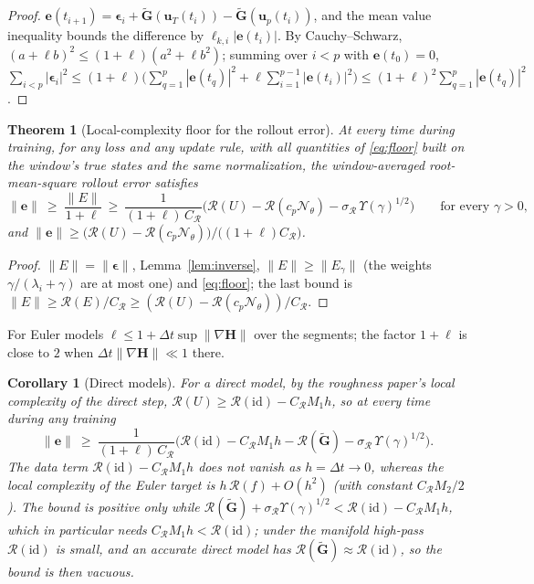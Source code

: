 \documentclass[11pt]{article}
\newtheorem{theorem}{Theorem}
\newtheorem{corollary}{Corollary}
\theoremstyle{definition}
\theoremstyle{remark}
\newcommand{\uu}{\mathbf{u}}
\newcommand{\ee}{\mathbf{e}}
\newcommand{\Gt}{\tilde{\mathbf{G}}}
\newcommand{\Hop}{\mathbf{H}}
\newcommand{\eps}{\bm{\epsilon}}
\newcommand{\Rgh}{\mathcal{R}}
\newcommand{\dt}{\Delta t}
\newcommand{\Nn}{\mathcal N_\theta}
\begin{document}
\begin{proof}
$\ee(t_{i+1})=\eps_i+\Gt(\uu_T(t_i))-\Gt(\uu_p(t_i))$, and the mean value inequality bounds the difference by $\ell_{k,i}|\ee(t_i)|$.
By Cauchy--Schwarz, $(a+\ell b)^2\le(1+\ell)(a^2+\ell b^2)$; summing over $i<p$ with $\ee(t_0)=0$, $\sum_{i<p}|\eps_i|^2\le(1+\ell)\big(\sum_{q=1}^p|\ee(t_q)|^2+\ell\sum_{i=1}^{p-1}|\ee(t_i)|^2\big)\le(1+\ell)^2\sum_{q=1}^p|\ee(t_q)|^2$.
\end{proof}

\begin{theorem}[Local-complexity floor for the rollout error]\label{thm:rolloutfloor}
At every time during training, for any loss and any update rule, with all quantities of \eqref{eq:floor} built on the window's true states and the same normalization, the window-averaged root-mean-square rollout error satisfies
\begin{equation}\label{eq:rolloutfloor}
\|\ee\|\ \ge\ \frac{\|E\|}{1+\ell}\ \ge\ \frac{1}{(1+\ell)\,C_\Rgh}\Big(\Rgh(U)-\Rgh(c_p\Nn)-\sigma_\Rgh\,\Upsilon(\gamma)^{1/2}\Big)\qquad\text{for every }\gamma>0,
\end{equation}
and $\|\ee\|\ge\big(\Rgh(U)-\Rgh(c_p\Nn)\big)/\big((1+\ell)C_\Rgh\big)$.
\end{theorem}

\begin{proof}
$\|E\|=\|\eps\|$, Lemma~\ref{lem:inverse}, $\|E\|\ge\|E_\gamma\|$ (the weights $\gamma/(\lambda_i+\gamma)$ are at most one) and \eqref{eq:floor}; the last bound is $\|E\|\ge\Rgh(E)/C_\Rgh\ge(\Rgh(U)-\Rgh(c_p\Nn))/C_\Rgh$.
\end{proof}

For Euler models $\ell\le1+\dt\sup\|\nabla\Hop\|$ over the segments; the factor $1+\ell$ is close to $2$ when $\dt\|\nabla\Hop\|\ll1$ there.

\begin{corollary}[Direct models]\label{cor:directrollout}
For a direct model, by the roughness paper's local complexity of the direct step, $\Rgh(U)\ge\Rgh(\mathrm{id})-C_\Rgh M_1h$, so at every time during any training
\[
\|\ee\|\ \ge\ \frac{1}{(1+\ell)\,C_\Rgh}\Big(\Rgh(\mathrm{id})-C_\Rgh M_1h-\Rgh(\Gt)-\sigma_\Rgh\,\Upsilon(\gamma)^{1/2}\Big).
\]
The data term $\Rgh(\mathrm{id})-C_\Rgh M_1h$ does not vanish as $h=\dt\to0$, whereas the local complexity of the Euler target is $h\,\Rgh(f)+O(h^2)$ (with constant $C_\Rgh M_2/2$).
The bound is positive only while $\Rgh(\Gt)+\sigma_\Rgh\Upsilon(\gamma)^{1/2}<\Rgh(\mathrm{id})-C_\Rgh M_1h$, which in particular needs $C_\Rgh M_1h<\Rgh(\mathrm{id})$; under the manifold high-pass $\Rgh(\mathrm{id})$ is small, and an accurate direct model has $\Rgh(\Gt)\approx\Rgh(\mathrm{id})$, so the bound is then vacuous.
\end{corollary}
\end{document}
